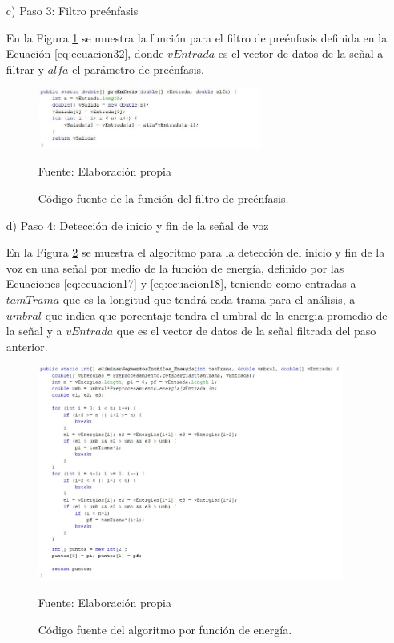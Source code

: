 \begin{enumerate}
\item[c)]Paso 3: Filtro preénfasis
\par
En la Figura \ref{fig:figura3.10} se muestra la función para el filtro de preénfasis definida en la Ecuación \eqref{eq:ecuacion32}, donde $vEntrada$ es el vector de datos de la señal a filtrar y $alfa$ el parámetro de preénfasis.
\begin{figure}[H]
\captionsetup{justification=centering}
\begin{center}
\includegraphics[width=0.7\textwidth]{Imagenes/Cap3/image010}
\end{center}
\begin{center}
\vskip -0.5cm
\caption{\small{Código fuente de la función del filtro de preénfasis.}}
\label{fig:figura3.10}
{\small{Fuente: Elaboración propia}}
\end{center}
\end{figure}

\item[d)]Paso 4: Detección de inicio y fin de la señal de voz
\par
En la Figura \ref{fig:figura3.11} se muestra el algoritmo para la detección del inicio y fin de la voz en una señal por medio de la función de energía, definido por las Ecuaciones \eqref{eq:ecuacion17} y \eqref{eq:ecuacion18}, teniendo como entradas a $tamTrama$ que es la longitud que tendrá cada trama para el análisis, a $umbral$ que indica que porcentaje tendra el umbral de la energia promedio de la señal y a $vEntrada$ que es el vector de datos de la señal filtrada del paso anterior.
\begin{figure}[H]
\captionsetup{justification=centering}
\begin{center}
\includegraphics[width=0.95\textwidth]{Imagenes/Cap3/image011}
\end{center}
\begin{center}
\vskip -0.5cm
\caption{\small{Código fuente del algoritmo por función de energía.}}
\label{fig:figura3.11}
{\small{Fuente: Elaboración propia}}
\end{center}
\end{figure}


\end{enumerate}

